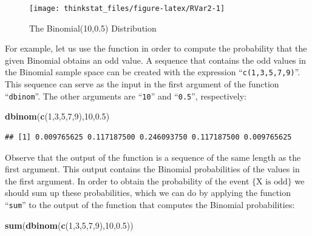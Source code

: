 \documentclass[]{krantz}
\makeatletter
\newenvironment{Shaded}{\begin{snugshade}}{\end{snugshade}}
\newcommand{\KeywordTok}[1]{\textcolor[rgb]{0.13,0.29,0.53}{\textbf{#1}}}
\newcommand{\DecValTok}[1]{\textcolor[rgb]{0.00,0.00,0.81}{#1}}
\newcommand{\FloatTok}[1]{\textcolor[rgb]{0.00,0.00,0.81}{#1}}
\newcommand{\NormalTok}[1]{#1}
\newenvironment{kframe}{%
\medskip{}
\setlength{\fboxsep}{.8em}
 \def\at@end@of@kframe{}%
 \ifinner\ifhmode%
  \def\at@end@of@kframe{\end{minipage}}%
  \begin{minipage}{\columnwidth}%
 \fi\fi%
 \def\FrameCommand##1{\hskip\@totalleftmargin \hskip-\fboxsep
 \colorbox{shadecolor}{##1}\hskip-\fboxsep
     \hskip-\linewidth \hskip-\@totalleftmargin \hskip\columnwidth}%
 \MakeFramed {\advance\hsize-\width
   \@totalleftmargin\z@ \linewidth\hsize
   \@setminipage}}%
 {\par\unskip\endMakeFramed%
 \at@end@of@kframe}
\renewenvironment{Shaded}{\begin{kframe}}{\end{kframe}}
\theoremstyle{definition}
\theoremstyle{definition}
\theoremstyle{definition}
\theoremstyle{remark}
\makeatother
\begin{document}
\begin{figure}

{\centering \texttt{[image: thinkstat\_files/figure-latex/RVar2-1]} 

}

\caption{The Binomial(10,0.5) Distribution}\label{fig:RVar2}
\end{figure}

For example, let us use the function in order to compute the probability
that the given Binomial obtains an odd value. A sequence that contains
the odd values in the Binomial sample space can be created with the
expression ``\texttt{c(1,3,5,7,9)}''. This sequence can serve as the
input in the first argument of the function ``\texttt{dbinom}''. The
other arguments are ``\texttt{10}'' and ``\texttt{0.5}'', respectively:

\begin{Shaded}
\begin{Highlighting}[]
\KeywordTok{dbinom}\NormalTok{(}\KeywordTok{c}\NormalTok{(}\DecValTok{1}\NormalTok{,}\DecValTok{3}\NormalTok{,}\DecValTok{5}\NormalTok{,}\DecValTok{7}\NormalTok{,}\DecValTok{9}\NormalTok{),}\DecValTok{10}\NormalTok{,}\FloatTok{0.5}\NormalTok{)}
\end{Highlighting}
\end{Shaded}

\begin{verbatim}
## [1] 0.009765625 0.117187500 0.246093750 0.117187500 0.009765625
\end{verbatim}

Observe that the output of the function is a sequence of the same length
as the first argument. This output contains the Binomial probabilities
of the values in the first argument. In order to obtain the probability
of the event \(\{\mbox{X is odd}\}\) we should sum up these
probabilities, which we can do by applying the function ``\texttt{sum}''
to the output of the function that computes the Binomial probabilities:

\begin{Shaded}
\begin{Highlighting}[]
\KeywordTok{sum}\NormalTok{(}\KeywordTok{dbinom}\NormalTok{(}\KeywordTok{c}\NormalTok{(}\DecValTok{1}\NormalTok{,}\DecValTok{3}\NormalTok{,}\DecValTok{5}\NormalTok{,}\DecValTok{7}\NormalTok{,}\DecValTok{9}\NormalTok{),}\DecValTok{10}\NormalTok{,}\FloatTok{0.5}\NormalTok{))}
\end{Highlighting}
\end{Shaded}
\end{document}
